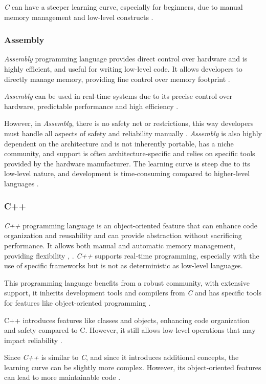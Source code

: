 \textit{C} can have a steeper learning curve, especially for beginners, due to manual memory management and low-level constructs \cite{LPROG2}.

\subsubsection{Assembly}
\textit{Assembly} programming language provides direct control over hardware and is highly efficient, and useful for writing low-level code.
It allows developers to directly manage memory, providing fine control over memory footprint \cite{LPROG7}.

\textit{Assembly} can be used in real-time systems due to its precise control over hardware, predictable performance and high efficiency \cite{LPROG5}.

However, in \textit{Assembly}, there is no safety net or restrictions, this way developers must handle all aspects of safety and reliability manually \cite{LPROG7}.
\textit{Assembly} is also highly dependent on the architecture and is not inherently portable, has a niche community, and support is often architecture-specific and relies on specific tools provided by the hardware manufacturer.
The learning curve is steep due to its low-level nature, and development is time-consuming compared to higher-level languages \cite{LPROG5}.

\subsubsection{C++}
\textit{C++} programming language is an object-oriented feature that can enhance code organization and reusability and can provide abstraction without sacrificing performance.
It allows both manual and automatic memory management, providing flexibility \cite{LPROG2}, \cite{LPROG6}.
\textit{C++} supports real-time programming, especially with the use of specific frameworks but is not as deterministic as low-level languages.

This programming language benefits from a robust community, with extensive support, it inherits development tools and compilers from \textit{C} and has specific tools for features like object-oriented programming \cite{LPROG7}.

C++ introduces features like classes and objects, enhancing code organization and safety compared to C.
However, it still allows low-level operations that may impact reliability \cite{LPROG5}.

Since \textit{C++} is similar to \textit{C}, and since it introduces additional concepts, the learning curve can be slightly more complex.
However, its object-oriented features can lead to more maintainable code \cite{LPROG7}.

